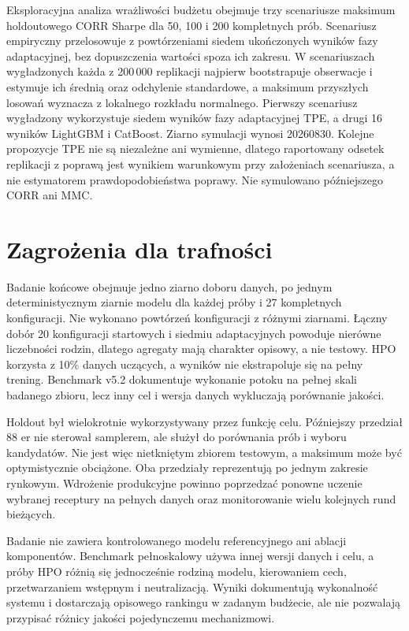\documentclass[12pt,a4paper]{report}
\begin{document}
Eksploracyjna analiza wrażliwości budżetu obejmuje trzy scenariusze maksimum
holdoutowego CORR Sharpe dla 50, 100 i 200 kompletnych prób. Scenariusz empiryczny
przelosowuje z powtórzeniami siedem ukończonych wyników fazy adaptacyjnej, bez
dopuszczenia wartości spoza ich zakresu. W scenariuszach wygładzonych każda z
200\,000 replikacji najpierw bootstrapuje obserwacje i estymuje ich średnią oraz
odchylenie standardowe, a maksimum przyszłych losowań wyznacza z lokalnego rozkładu
normalnego. Pierwszy scenariusz wygładzony wykorzystuje siedem wyników fazy
adaptacyjnej TPE, a drugi 16 wyników LightGBM i CatBoost. Ziarno symulacji wynosi
20260830.
Kolejne propozycje TPE nie są niezależne ani wymienne, dlatego raportowany odsetek
replikacji z poprawą jest wynikiem warunkowym przy założeniach scenariusza, a nie
estymatorem prawdopodobieństwa poprawy. Nie symulowano późniejszego CORR ani MMC.

\section{Zagrożenia dla trafności}
Badanie końcowe obejmuje jedno ziarno doboru danych, po jednym deterministycznym
ziarnie modelu dla każdej próby i 27 kompletnych konfiguracji. Nie wykonano
powtórzeń konfiguracji z różnymi ziarnami. Łączny dobór 20 konfiguracji startowych
i siedmiu adaptacyjnych powoduje nierówne liczebności rodzin, dlatego agregaty mają charakter
opisowy, a nie testowy. HPO korzysta z 10\% danych uczących, a wyników nie
ekstrapoluje się na pełny trening. Benchmark v5.2 dokumentuje wykonanie potoku na
pełnej skali badanego zbioru, lecz inny cel i wersja danych wykluczają porównanie
jakości.

Holdout był wielokrotnie wykorzystywany przez funkcję celu. Późniejszy przedział
88 er nie sterował samplerem, ale służył do porównania prób i wyboru kandydatów.
Nie jest więc nietkniętym zbiorem testowym, a maksimum może być optymistycznie
obciążone. Oba przedziały reprezentują po jednym zakresie rynkowym. Wdrożenie
produkcyjne powinno poprzedzać ponowne uczenie wybranej receptury na pełnych
danych oraz monitorowanie wielu kolejnych rund bieżących.

Badanie nie zawiera kontrolowanego modelu referencyjnego ani ablacji komponentów.
Benchmark pełnoskalowy używa innej wersji danych i celu, a próby HPO różnią się
jednocześnie rodziną modelu, kierowaniem cech, przetwarzaniem wstępnym i neutralizacją.
Wyniki dokumentują wykonalność systemu i dostarczają opisowego rankingu w zadanym
budżecie, ale nie pozwalają przypisać różnicy jakości pojedynczemu mechanizmowi.



\clearpage
\begingroup
\singlespacing
\setcounter{tocdepth}{1}
\listoftables
{}
{}
\listoffigures
{}
{}
\endgroup

\clearpage
\printbibliography[heading=bibintoc,title={Bibliografia}]
\end{document}
